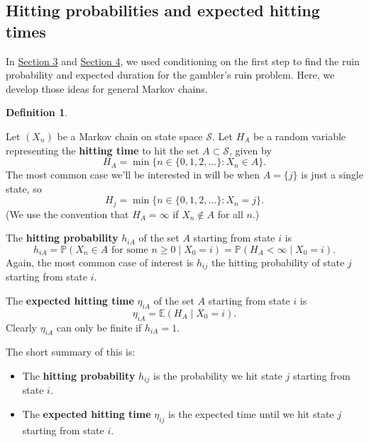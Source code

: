 \documentclass[
  a4paper,
]{article}
\providecommand{\tightlist}{%
  \setlength{\itemsep}{0pt}\setlength{\parskip}{0pt}}
\theoremstyle{definition}
\newtheorem{definition}{Definition}[section]
\theoremstyle{definition}
\theoremstyle{definition}
\theoremstyle{remark}
\begin{document}
\hypertarget{hitting-definitions}{%
\subsection{Hitting probabilities and expected hitting times}\label{hitting-definitions}}

In \protect\hyperlink{S03-gamblers-ruin}{Section 3} and \protect\hyperlink{S04-ldes}{Section 4}, we used conditioning on the first step to find the ruin probability and expected duration for the gambler's ruin problem. Here, we develop those ideas for general Markov chains.

\begin{definition}
\protect\hypertarget{def:hitting-defs}{}\label{def:hitting-defs}

Let \((X_n)\) be a Markov chain on state space \(\mathcal S\). Let \(H_{A}\) be a random variable representing the \textbf{hitting time} to hit the set \(A \subset \mathcal S\), given by
\[ H_{A} = \min \big\{n \in \{0,1,2,\dots\} : X_n \in A  \big\}  . \]
The most common case we'll be interested in will be when \(A = \{j\}\) is just a single state, so
\[ H_{j} = \min \big\{n \in \{0,1,2,\dots\} : X_n = j  \big\}  . \]
(We use the convention that \(H_A = \infty\) if \(X_n \not\in A\) for all \(n\).)

The \textbf{hitting probability} \(h_{iA}\) of the set \(A\) starting from state \(i\) is
\[ h_{iA} = \mathbb P(X_n \in A \text{ for some $n \geq 0$} \mid X_0 = i) = \mathbb P(H_A < \infty \mid X_0 = i) .  \]
Again, the most common case of interest is \(h_{ij}\) the hitting probability of state \(j\) starting from state \(i\).

The \textbf{expected hitting time} \(\eta_{iA}\) of the set \(A\) starting from state \(i\) is
\[ \eta_{iA} = \mathbb E(H_A \mid X_0 = i) .  \]
Clearly \(\eta_{iA}\) can only be finite if \(h_{iA} = 1\).

\end{definition}

The short summary of this is:

\begin{itemize}
\tightlist
\item
  The \textbf{hitting probability} \(h_{ij}\) is the probability we hit state \(j\) starting from state \(i\).
\item
  The \textbf{expected hitting time} \(\eta_{ij}\) is the expected time until we hit state \(j\) starting from state \(i\).
\end{itemize}
\end{document}
